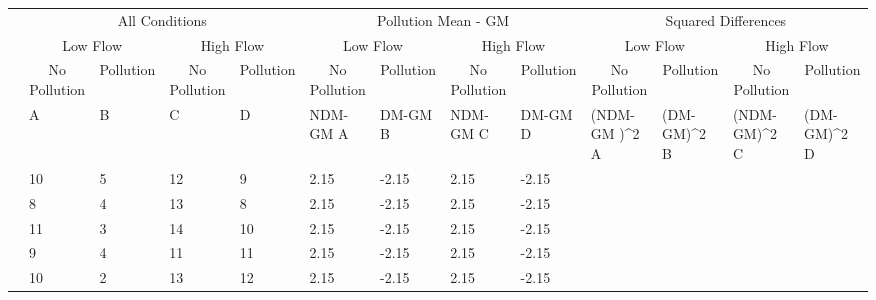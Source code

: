 \documentclass[
  letterpaper,
  DIV=11,
  numbers=noendperiod]{scrreprt}
\begin{document}
\begin{table}
\centering
\begin{tabular}{l|l|l|l|l|l|l|l|l|>{}l|>{}l|>{}l|>{}l}
\hline
\multicolumn{1}{c|}{ } & \multicolumn{4}{c|}{All Conditions} & \multicolumn{4}{c|}{Pollution Mean - GM} & \multicolumn{4}{c}{Squared Differences} \\
\cline{2-5} \cline{6-9} \cline{10-13}
\multicolumn{1}{c|}{ } & \multicolumn{2}{c|}{Low Flow} & \multicolumn{2}{c|}{High Flow} & \multicolumn{2}{c|}{Low Flow} & \multicolumn{2}{c|}{High Flow} & \multicolumn{2}{c|}{Low Flow} & \multicolumn{2}{c}{High Flow} \\
\cline{2-3} \cline{4-5} \cline{6-7} \cline{8-9} \cline{10-11} \cline{12-13}
\multicolumn{1}{c|}{ } & \multicolumn{1}{c|}{No Pollution} & \multicolumn{1}{c|}{Pollution} & \multicolumn{1}{c|}{No Pollution} & \multicolumn{1}{c|}{Pollution} & \multicolumn{1}{c|}{No Pollution} & \multicolumn{1}{c|}{Pollution} & \multicolumn{1}{c|}{No Pollution} & \multicolumn{1}{c|}{Pollution} & \multicolumn{1}{c|}{No Pollution} & \multicolumn{1}{c|}{Pollution} & \multicolumn{1}{c|}{No Pollution} & \multicolumn{1}{c}{Pollution} \\
\cline{2-2} \cline{3-3} \cline{4-4} \cline{5-5} \cline{6-6} \cline{7-7} \cline{8-8} \cline{9-9} \cline{10-10} \cline{11-11} \cline{12-12} \cline{13-13}
  & A & B & C & D & NDM-GM A & DM-GM B & NDM-GM C & DM-GM D & (NDM-GM )\textasciicircum{}2 A & (DM-GM)\textasciicircum{}2 B & (NDM-GM)\textasciicircum{}2 C & (DM-GM)\textasciicircum{}2 D\\
\hline
 & 10 & 5 & 12 & 9 & 2.15 & -2.15 & 2.15 & -2.15 & \cellcolor{yellow}{4.6225} & \cellcolor{yellow}{4.6225} & \cellcolor{yellow}{4.6225} & \cellcolor{yellow}{4.6225}\\
\hline
 & 8 & 4 & 13 & 8 & 2.15 & -2.15 & 2.15 & -2.15 & \cellcolor{yellow}{4.6225} & \cellcolor{yellow}{4.6225} & \cellcolor{yellow}{4.6225} & \cellcolor{yellow}{4.6225}\\
\hline
 & 11 & 3 & 14 & 10 & 2.15 & -2.15 & 2.15 & -2.15 & \cellcolor{yellow}{4.6225} & \cellcolor{yellow}{4.6225} & \cellcolor{yellow}{4.6225} & \cellcolor{yellow}{4.6225}\\
\hline
 & 9 & 4 & 11 & 11 & 2.15 & -2.15 & 2.15 & -2.15 & \cellcolor{yellow}{4.6225} & \cellcolor{yellow}{4.6225} & \cellcolor{yellow}{4.6225} & \cellcolor{yellow}{4.6225}\\
\hline
 & 10 & 2 & 13 & 12 & 2.15 & -2.15 & 2.15 & -2.15 & \cellcolor{yellow}{4.6225} & \cellcolor{yellow}{4.6225} & \cellcolor{yellow}{4.6225} & \cellcolor{yellow}{4.6225}\\

\end{tabular}
\end{table}
\end{document}
